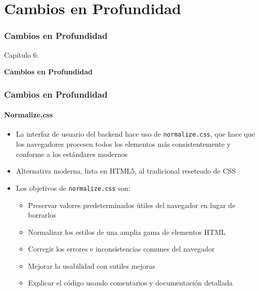 %

\section{Cambios en Profundidad}
\begin{frame}[fragile]
	\frametitle{Cambios en Profundidad}

	\begin{center}\huge{Capítulo 6:}\end{center}
	\begin{center}\huge{\color{typo3darkgrey}\textbf{Cambios en Profundidad}}\end{center}

\end{frame}


\begin{frame}[fragile]
	\frametitle{Cambios en Profundidad}
	\framesubtitle{Normalize.css}

	\begin{itemize}
		\item La interfaz de usuario del backend hace uso de \texttt{normalize.css},\newline
			que hace que los navegadores procesen todos los elementos más consistentemente y conforme a los estándares modernos
		\item Alternativa moderna, lista en HTML5, al tradicional reseteado de CSS
		\item Los objetivos de \texttt{normalize.css} son:

			\begin{itemize}
				\item Preservar valores predeterminados útiles del navegador en lugar de borrarlos
				\item Normalizar los estilos de una amplia gama de elementos HTML
				\item Corregir los errores e inconsistencias comunes del navegador
				\item Mejorar la usabilidad con sutiles mejoras
				\item Explicar el código usando comentarios y documentación detallada
			\end{itemize}

	\end{itemize}

\end{frame}

